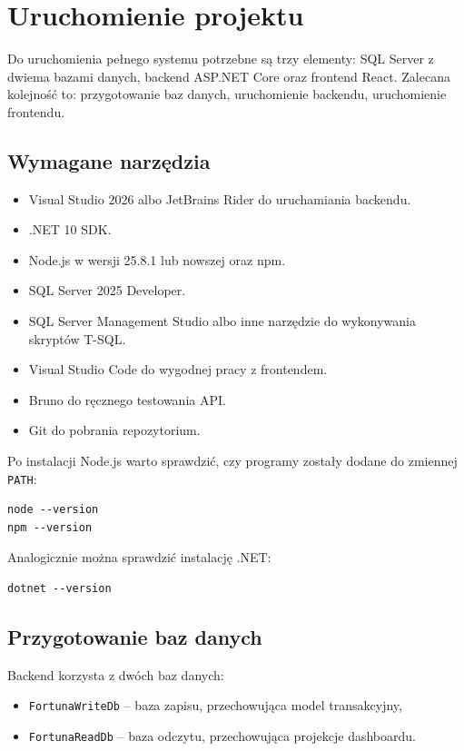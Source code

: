 \documentclass[12pt,a4paper]{article}
\begin{document}
\section{Uruchomienie projektu}

Do uruchomienia pełnego systemu potrzebne są trzy elementy: SQL Server z dwiema bazami danych, backend ASP.NET Core oraz frontend React. Zalecana kolejność to: przygotowanie baz danych, uruchomienie backendu, uruchomienie frontendu.

\subsection{Wymagane narzędzia}

\begin{itemize}[nosep]
    \item Visual Studio 2026 albo JetBrains Rider do uruchamiania backendu.
    \item .NET 10 SDK.
    \item Node.js w wersji 25.8.1 lub nowszej oraz npm.
    \item SQL Server 2025 Developer.
    \item SQL Server Management Studio albo inne narzędzie do wykonywania skryptów T-SQL.
    \item Visual Studio Code do wygodnej pracy z frontendem.
    \item Bruno do ręcznego testowania API.
    \item Git do pobrania repozytorium.
\end{itemize}

Po instalacji Node.js warto sprawdzić, czy programy zostały dodane do zmiennej \texttt{PATH}:

\begin{verbatim}
node --version
npm --version
\end{verbatim}

Analogicznie można sprawdzić instalację .NET:

\begin{verbatim}
dotnet --version
\end{verbatim}

\subsection{Przygotowanie baz danych}

Backend korzysta z dwóch baz danych:
\begin{itemize}[nosep]
    \item \texttt{FortunaWriteDb} -- baza zapisu, przechowująca model transakcyjny,
    \item \texttt{FortunaReadDb} -- baza odczytu, przechowująca projekcje dashboardu.
\end{itemize}
\end{document}
